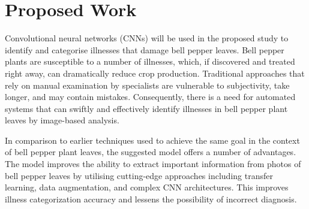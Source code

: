 \documentclass[conference]{IEEEtran}
\begin{document}









\section{Proposed Work}
Convolutional neural networks (CNNs) will be used in the proposed study to identify and categorise illnesses that damage bell pepper leaves. Bell pepper plants are susceptible to a number of illnesses, which, if discovered and treated right away, can dramatically reduce crop production. Traditional approaches that rely on manual examination by specialists are vulnerable to subjectivity, take longer, and may contain mistakes. Consequently, there is a need for automated systems that can swiftly and effectively identify illnesses in bell pepper plant leaves by image-based analysis.

In comparison to earlier techniques used to achieve the same goal in the context of bell pepper plant leaves, the suggested model offers a number of advantages. The model improves the ability to extract important information from photos of bell pepper leaves by utilising cutting-edge approaches including transfer learning, data augmentation, and complex CNN architectures. This improves illness categorization accuracy and lessens the possibility of incorrect diagnosis.
\end{document}
